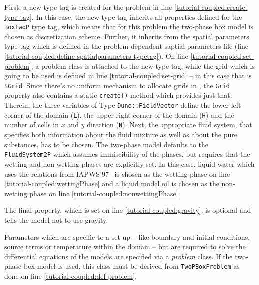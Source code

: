 \begin{lst}\label{tutorial-coupled:problemfile} \mbox{}

\end{lst}

First, a new type tag is created for the problem in line
\ref{tutorial-coupled:create-type-tag}.  In this case, the new type
tag inherits all properties defined for the \texttt{BoxTwoP} type tag,
which means that for this problem the two-phase box model is chosen as
discretization scheme. Further, it inherits from the spatial parameters type tag which is defined in the problem dependent saptial parameters file (line \ref{tutorial-coupled:define-spatialparameters-typetag}). On line \ref{tutorial-coupled:set-problem}, a
problem class is attached to the new type tag, while the grid which
is going to be used is defined in line \ref{tutorial-coupled:set-grid} --
in this case that is  \texttt{SGrid}.  Since there's no uniform
mechanism to allocate grids in \Dune, the \texttt{Grid} property also contains
a static \texttt{create()} method which provides just that. Therein, the three variables of 
Type \texttt{Dune::FieldVector} define the lower left corner of the domain 
(\texttt{L}), the upper right corner of the domain (\texttt{H}) and the number 
of cells in $x$ and $y$ direction (\texttt{N}). Next,
the appropriate fluid system, that specifies both information about
the fluid mixture as well as about the pure substances, has to be chosen. 
The two-phase model defaults to the \texttt{FluidSystem2P} which assumes 
immiscibility of the phases, but requires that the wetting and non-wetting phases
are explicitly set. In this case, liquid water which uses the relations from 
IAPWS'97~\cite{IAPWS1997} is chosen as the wetting phase on line
\ref{tutorial-coupled:wettingPhase} and a liquid model oil is chosen as the 
non-wetting phase on line \ref{tutorial-coupled:nonwettingPhase}. 

The final property, which is set on line
\ref{tutorial-coupled:gravity}, is optional and tells the model not to
use gravity.

Parameters which are specific to a set-up -- like boundary and initial
conditions, source terms or temperature within the domain -- but are
required to solve the differential equations of the models are
specified via a \textit{problem} class. If the two-phase box model is
used, this class must be derived from \texttt{TwoPBoxProblem} as done
on line \ref{tutorial-coupled:def-problem}.

